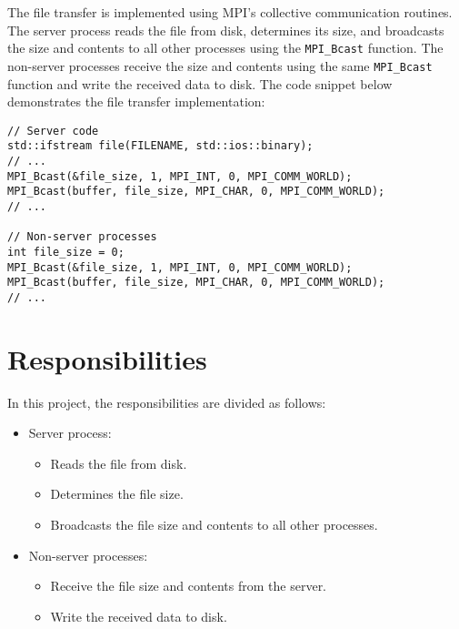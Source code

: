 \documentclass{article}
\begin{document}
The file transfer is implemented using MPI's collective communication routines. The server process reads the file from disk, determines its size, and broadcasts the size and contents to all other processes using the \texttt{MPI\_Bcast} function. The non-server processes receive the size and contents using the same \texttt{MPI\_Bcast} function and write the received data to disk. The code snippet below demonstrates the file transfer implementation:

\begin{verbatim}
// Server code
std::ifstream file(FILENAME, std::ios::binary);
// ...
MPI_Bcast(&file_size, 1, MPI_INT, 0, MPI_COMM_WORLD);
MPI_Bcast(buffer, file_size, MPI_CHAR, 0, MPI_COMM_WORLD);
// ...

// Non-server processes
int file_size = 0;
MPI_Bcast(&file_size, 1, MPI_INT, 0, MPI_COMM_WORLD);
MPI_Bcast(buffer, file_size, MPI_CHAR, 0, MPI_COMM_WORLD);
// ...
\end{verbatim}

\section{Responsibilities}

In this project, the responsibilities are divided as follows:

\begin{itemize}
  \item Server process:
  \begin{itemize}
    \item Reads the file from disk.
    \item Determines the file size.
    \item Broadcasts the file size and contents to all other processes.
  \end{itemize}
  \item Non-server processes:
  \begin{itemize}
    \item Receive the file size and contents from the server.
    \item Write the received data to disk.
  \end{itemize}
\end{itemize}
\end{document}

